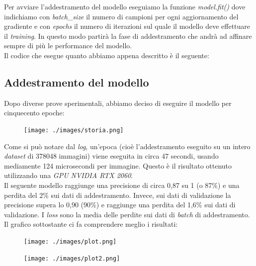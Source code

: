 \vspace*{2ex}
\vspace*{2ex}
\noindent Per avviare l'addestramento del modello eseguiamo la funzione \textit{model.fit()} dove indichiamo con \textit{batch\_size} il numero di campioni per ogni aggiornamento del gradiente e con \textit{epochs} il numero di iterazioni sul quale il modello deve effettuare il \textit{training}. In questo modo partirà la fase di addestramento che andrà ad affinare sempre di più le performance del modello.\\
\newline
Il codice che esegue quanto abbiamo appena descritto è il seguente:
\vspace*{2ex}
\subsection{Addestramento del modello}
Dopo diverse prove sperimentali, abbiamo deciso di eseguire il modello per cinquecento epoche:
\begin{figure}[H]
	\centering
	\texttt{[image: ./images/storia.png]}
\end{figure}
\noindent Come si può notare dal \textit{log}, un’epoca (cioè l’addestramento eseguito su un intero \textit{dataset} di 378048 immagini) viene eseguita in circa 47 secondi, usando mediamente 124 microsecondi per immagine. Questo è il risultato ottenuto utilizzando una \textit{GPU NVIDIA RTX 2060}.\\
\newline
Il seguente modello raggiunge una precisione di circa 0,87 su 1 (o 87\%) e una perdita del 2\% sui dati di addestramento. Invece, sui dati di validazione la precisione supera lo 0,90 (90\%) e raggiunge una perdita del 1,6\% sui dati di validazione. I \textit{loss} sono la media delle perdite sui dati di \textit{batch} di addestramento.\\
\newline
Il grafico sottostante ci fa comprendere meglio i risultati:
\begin{figure}[H]
	\centering
	\texttt{[image: ./images/plot.png]}
\end{figure}
\begin{figure}[H]
	\centering
	\texttt{[image: ./images/plot2.png]}
\end{figure}

